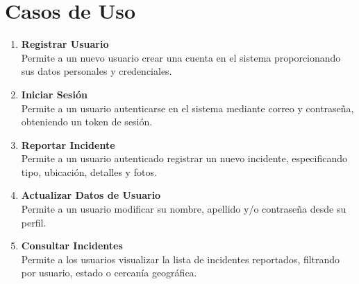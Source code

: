 \section{Casos de Uso}

\begin{enumerate}
    \item \textbf{Registrar Usuario} \\
    Permite a un nuevo usuario crear una cuenta en el sistema proporcionando sus datos personales y credenciales.
    
    \item \textbf{Iniciar Sesión} \\
    Permite a un usuario autenticarse en el sistema mediante correo y contraseña, obteniendo un token de sesión.
    
    \item \textbf{Reportar Incidente} \\
    Permite a un usuario autenticado registrar un nuevo incidente, especificando tipo, ubicación, detalles y fotos.
    
    \item \textbf{Actualizar Datos de Usuario} \\
    Permite a un usuario modificar su nombre, apellido y/o contraseña desde su perfil.
    
    \item \textbf{Consultar Incidentes} \\
    Permite a los usuarios visualizar la lista de incidentes reportados, filtrando por usuario, estado o cercanía geográfica.
\end{enumerate}




